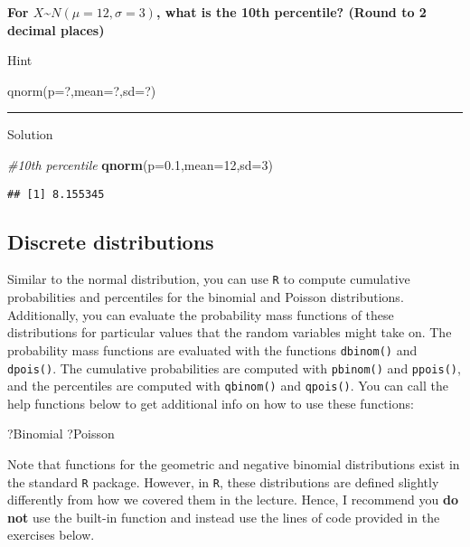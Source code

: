 \documentclass[
]{book}
\newenvironment{Shaded}{\begin{snugshade}}{\end{snugshade}}
\newcommand{\AttributeTok}[1]{\textcolor[rgb]{0.13,0.29,0.53}{#1}}
\newcommand{\CommentTok}[1]{\textcolor[rgb]{0.56,0.35,0.01}{\textit{#1}}}
\newcommand{\DecValTok}[1]{\textcolor[rgb]{0.00,0.00,0.81}{#1}}
\newcommand{\FloatTok}[1]{\textcolor[rgb]{0.00,0.00,0.81}{#1}}
\newcommand{\FunctionTok}[1]{\textcolor[rgb]{0.13,0.29,0.53}{\textbf{#1}}}
\newcommand{\NormalTok}[1]{#1}
\begin{document}
\textbf{For \(X\)\textasciitilde{}\(N(\mu=12,\sigma=3)\), what is the 10th percentile? (Round to 2 decimal places)}

Hint

qnorm(p=?,mean=?,sd=?)

\begin{center}\rule{0.5\linewidth}{0.5pt}\end{center}

Solution

\begin{Shaded}
\begin{Highlighting}[]
\CommentTok{\#10th percentile}
\FunctionTok{qnorm}\NormalTok{(}\AttributeTok{p=}\FloatTok{0.1}\NormalTok{,}\AttributeTok{mean=}\DecValTok{12}\NormalTok{,}\AttributeTok{sd=}\DecValTok{3}\NormalTok{)}
\end{Highlighting}
\end{Shaded}

\begin{verbatim}
## [1] 8.155345
\end{verbatim}

\hypertarget{discrete-distributions}{%
\subsection{Discrete distributions}\label{discrete-distributions}}

Similar to the normal distribution, you can use \texttt{R} to compute cumulative probabilities and percentiles for the binomial and Poisson distributions. Additionally, you can evaluate the probability mass functions of these distributions for particular values that the random variables might take on. The probability mass functions are evaluated with the functions \texttt{dbinom()} and \texttt{dpois()}. The cumulative probabilities are computed with \texttt{pbinom()} and \texttt{ppois()}, and the percentiles are computed with \texttt{qbinom()} and \texttt{qpois()}. You can call the help functions below to get additional info on how to use these functions:

\begin{Shaded}
\begin{Highlighting}[]
\NormalTok{?Binomial}
\NormalTok{?Poisson}
\end{Highlighting}
\end{Shaded}

Note that functions for the geometric and negative binomial distributions exist in the standard \texttt{R} package. However, in \texttt{R}, these distributions are defined slightly differently from how we covered them in the lecture. Hence, I recommend you \textbf{do not} use the built-in function and instead use the lines of code provided in the exercises below.
\end{document}
